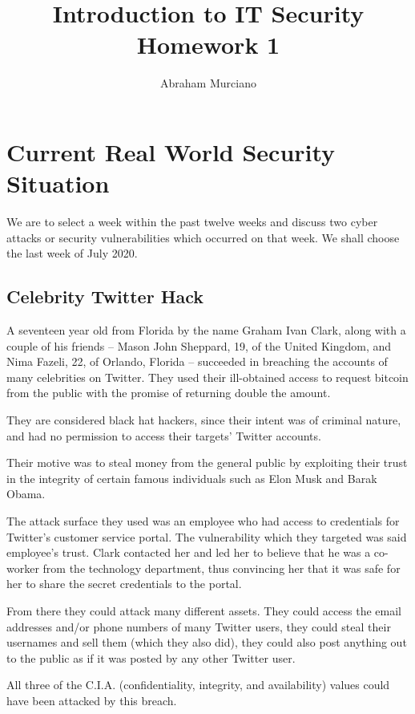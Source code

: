 \documentclass{article}
\title{Introduction to IT Security\\
\large Homework 1}
\author{Abraham Murciano}
\begin{document}
\maketitle

\section{Current Real World Security Situation}

We are to select a week within the past twelve weeks and discuss two cyber attacks or security vulnerabilities which occurred on that week. We shall choose the last week of July 2020.

\subsection{Celebrity Twitter Hack}

A seventeen year old from Florida by the name Graham Ivan Clark, along with a couple of his friends -- Mason John Sheppard, 19, of the United Kingdom, and Nima Fazeli, 22, of Orlando, Florida -- succeeded in breaching the accounts of many celebrities on Twitter. They used their ill-obtained access to request bitcoin from the public with the promise of returning double the amount.

They are considered black hat hackers, since their intent was of criminal nature, and had no permission to access their targets' Twitter accounts.

Their motive was to steal money from the general public by exploiting their trust in the integrity of certain famous individuals such as Elon Musk and Barak Obama.

The attack surface they used was an employee who had access to credentials for Twitter's customer service portal. The vulnerability which they targeted was said employee's trust. Clark contacted her and led her to believe that he was a co-worker from the technology department, thus convincing her that it was safe for her to share the secret credentials to the portal.

From there they could attack many different assets. They could access the email addresses and/or phone numbers of many Twitter users, they could steal their usernames and sell them (which they also did), they could also post anything out to the public as if it was posted by any other Twitter user.

All three of the C.I.A. (confidentiality, integrity, and availability) values could have been attacked by this breach.
\end{document}
